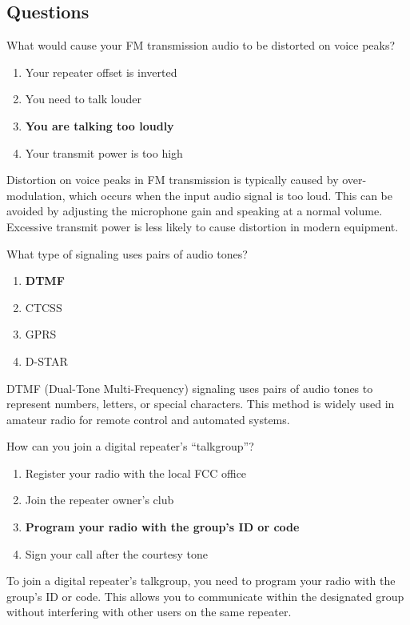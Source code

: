 \subsection*{Questions}
\begin{tcolorbox}[colback=gray!10!white,colframe=black!75!black,title={T2B05}]
    What would cause your FM transmission audio to be distorted on voice peaks?
    \begin{enumerate}[label=\Alph*),noitemsep]
        \item Your repeater offset is inverted
        \item You need to talk louder
        \item \textbf{You are talking too loudly}
        \item Your transmit power is too high
    \end{enumerate}
\end{tcolorbox}
Distortion on voice peaks in FM transmission is typically caused by over-modulation, which occurs when the input audio signal is too loud. This can be avoided by adjusting the microphone gain and speaking at a normal volume. Excessive transmit power is less likely to cause distortion in modern equipment.


\begin{tcolorbox}[colback=gray!10!white,colframe=black!75!black,title={T2B06}]
    What type of signaling uses pairs of audio tones?
    \begin{enumerate}[label=\Alph*),noitemsep]
        \item \textbf{DTMF}
        \item CTCSS
        \item GPRS
        \item D-STAR
    \end{enumerate}
\end{tcolorbox}
DTMF (Dual-Tone Multi-Frequency) signaling uses pairs of audio tones to represent numbers, letters, or special characters. This method is widely used in amateur radio for remote control and automated systems.


\begin{tcolorbox}[colback=gray!10!white,colframe=black!75!black,title={T2B07}]
    How can you join a digital repeater’s “talkgroup”?
    \begin{enumerate}[label=\Alph*),noitemsep]
        \item Register your radio with the local FCC office
        \item Join the repeater owner’s club
        \item \textbf{Program your radio with the group’s ID or code}
        \item Sign your call after the courtesy tone
    \end{enumerate}
\end{tcolorbox}
To join a digital repeater's talkgroup, you need to program your radio with the group's ID or code. This allows you to communicate within the designated group without interfering with other users on the same repeater.

